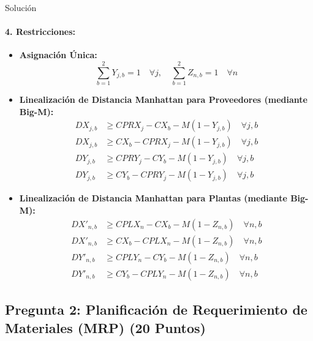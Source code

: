 \documentclass[11pt, a4paper]{article}
\begin{document}
\begin{ejercicio}{Solución}
  \paragraph{4. Restricciones:}
  \begin{itemize}
    \item \textbf{Asignación Única:}
    \begin{equation}
      \sum_{b=1}^{2} Y_{j,b} = 1 \quad \forall j, \quad \sum_{b=1}^{2} Z_{n,b} = 1 \quad \forall n
    \end{equation}
    \item \textbf{Linealización de Distancia Manhattan para Proveedores (mediante Big-M):}
    \begin{align}
      DX_{j,b} &\ge CPRX_j - CX_b - M(1 - Y_{j,b}) \quad \forall j, b \\
      DX_{j,b} &\ge CX_b - CPRX_j - M(1 - Y_{j,b}) \quad \forall j, b \\
      DY_{j,b} &\ge CPRY_j - CY_b - M(1 - Y_{j,b}) \quad \forall j, b \\
      DY_{j,b} &\ge CY_b - CPRY_j - M(1 - Y_{j,b}) \quad \forall j, b
    \end{align}
    \item \textbf{Linealización de Distancia Manhattan para Plantas (mediante Big-M):}
    \begin{align}
      DX'_{n,b} &\ge CPLX_n - CX_b - M(1 - Z_{n,b}) \quad \forall n, b \\
      DX'_{n,b} &\ge CX_b - CPLX_n - M(1 - Z_{n,b}) \quad \forall n, b \\
      DY'_{n,b} &\ge CPLY_n - CY_b - M(1 - Z_{n,b}) \quad \forall n, b \\
      DY'_{n,b} &\ge CY_b - CPLY_n - M(1 - Z_{n,b}) \quad \forall n, b
    \end{align}
  \end{itemize}

\end{ejercicio}

\newpage

\subsection*{Pregunta 2: Planificación de Requerimiento de Materiales (MRP) (20 Puntos)}
\end{document}
